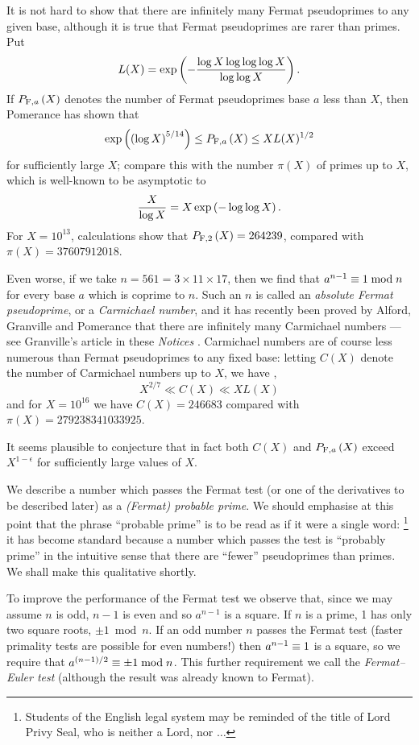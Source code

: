 It is not hard to show that there are infinitely many Fermat pseudoprimes
to any given base, although it is true that Fermat pseudoprimes are rarer
than primes.
Put
$$
L(X) = \exp\left(- {\log X \log\log\log X \over \log\log X}\right) .
$$
If $\P F,a(X)$ denotes the number of Fermat
pseudoprimes base $a$ less than $X$, then Pomerance has shown \cite{35,36} that
$$
\exp\left({\left(\log X\right)^{5/14}}\right) \le \P F,a(X) \le X L(X)^{1/2}
$$
for sufficiently large $X$;  compare this with the number $\pi(X)$ of
primes up to $X$, which is well-known to be asymptotic to
$$
{X \over \log X} = X \exp\left( - \log\log X \right) .
$$
For $X = 10^{13}$, calculations \cite{33} show
that $\P F,2(X) = 264239$, compared with $\pi(X) = 37 607 912 018$.

Even worse, if we take $n = 561 = 3 \times 11 \times 17$, then we find
that $a^{n-1} \equiv 1 \bmod n$ for every base $a$ which is coprime
to $n$.  Such an $n$ is called an {\it absolute Fermat
pseudoprime}, or a {\it Carmichael number}, and it has recently been
proved by Alford, Granville and Pomerance \cite{1} that there are infinitely
many Carmichael numbers --- see Granville's article in these {\sl Notices} \cite{22}.
Carmichael numbers are of course less numerous than Fermat pseudoprimes to
any fixed base: letting $C(X)$ denote the number of Carmichael numbers
up to $X$, we have \cite{1},\cite{35}
$$
X^{2/7} \ll C(X) \ll X L(X)
$$
and for $X = 10^{16}$ we have \cite{31} $C(X) =  246683$
compared with $\pi(X) = 279 238 341 033 925$.

It seems plausible to conjecture that in fact both $C(X)$ and $\P F,a(X)$ exceed
$X^{1 - \epsilon}$ for sufficiently large values of $X$.

We describe a number which passes the Fermat test (or one of the derivatives
to be described later) as a {\it (Fermat) probable prime}.  We should emphasise
at this point that the phrase ``probable prime'' is to be read as if it were
a single word:
\footnote{Students of the English legal system may be reminded
of the title of Lord Privy Seal, who is neither a Lord, nor $\ldots$}
it has become standard because a number which passes the test is
``probably prime'' in the intuitive sense that there are ``fewer'' pseudoprimes
than primes.  We shall make this qualitative shortly.

To improve the performance of the Fermat test we observe that, since we may
assume $n$ is odd, $n - 1$ is even and so $a^{n-1}$ is a square.  If $n$ is
a prime, 1 has only two square roots, $\pm 1 \bmod n$.
If an odd number $n$ passes the Fermat test (faster primality tests are
possible for even numbers!) then $a^{n-1} \equiv 1$ is a square, so
we require that $a^{(n-1)/2} \equiv \pm 1 \bmod n$.
This further requirement we call the {\it Fermat--Euler test} (although the result
was already known to Fermat).

